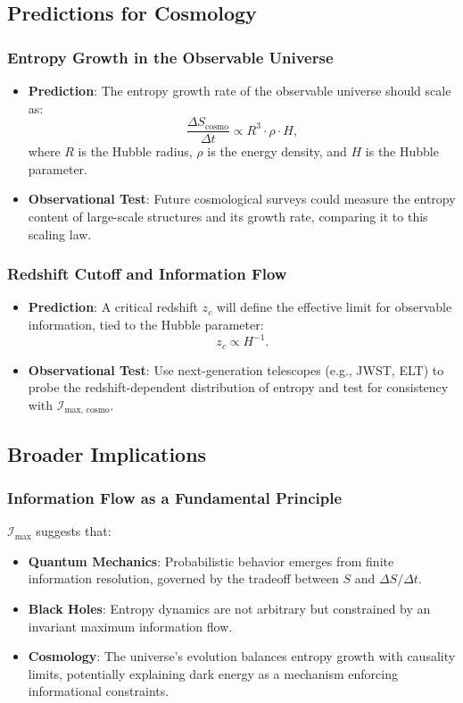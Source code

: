 \documentclass[12pt]{article}
\begin{document}
\subsection{Predictions for Cosmology}
\subsubsection{Entropy Growth in the Observable Universe}
\begin{itemize}
    \item \textbf{Prediction}: The entropy growth rate of the observable universe should scale as:
    \[
    \frac{\Delta S_{\text{cosmo}}}{\Delta t} \propto R^3 \cdot \rho \cdot H,
    \]
    where \( R \) is the Hubble radius, \( \rho \) is the energy density, and \( H \) is the Hubble parameter.
    \item \textbf{Observational Test}: Future cosmological surveys could measure the entropy content of large-scale structures and its growth rate, comparing it to this scaling law.
\end{itemize}

\subsubsection{Redshift Cutoff and Information Flow}
\begin{itemize}
    \item \textbf{Prediction}: A critical redshift \( z_c \) will define the effective limit for observable information, tied to the Hubble parameter:
    \[
    z_c \propto H^{-1}.
    \]
    \item \textbf{Observational Test}: Use next-generation telescopes (e.g., JWST, ELT) to probe the redshift-dependent distribution of entropy and test for consistency with \( \mathcal{I}_{\text{max, cosmo}} \).
\end{itemize}

\subsection{Broader Implications}
\subsubsection{Information Flow as a Fundamental Principle}
\( \mathcal{I}_{\text{max}} \) suggests that:
\begin{itemize}
    \item \textbf{Quantum Mechanics}: Probabilistic behavior emerges from finite information resolution, governed by the tradeoff between \( S \) and \( \Delta S / \Delta t \).
    \item \textbf{Black Holes}: Entropy dynamics are not arbitrary but constrained by an invariant maximum information flow.
    \item \textbf{Cosmology}: The universe’s evolution balances entropy growth with causality limits, potentially explaining dark energy as a mechanism enforcing informational constraints.
\end{itemize}
\end{document}
